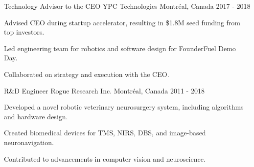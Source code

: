 \begin{cventries}
    \cventry
    {Technology Advisor to the CEO}
    {YPC Technologies}
    {Montréal, Canada}
    {2017 - 2018}
    {
        \begin{cvitems}
            \item{Advised CEO during startup accelerator, resulting in \$1.8M seed funding from top investors.}
            \item{Led engineering team for robotics and software design for FounderFuel Demo Day.}
            \item{Collaborated on strategy and execution with the CEO.}
        \end{cvitems}
    }

    \cventry
    {R\&D Engineer}
    {Rogue Research Inc.}
    {Montréal, Canada}
    {2011 - 2018}
    {
        \begin{cvitems}
            \item{Developed a novel robotic veterinary neurosurgery system, including algorithms and hardware design.}
            \item{Created biomedical devices for TMS, NIRS, DBS, and image-based neuronavigation.}
            \item{Contributed to advancements in computer vision and neuroscience.}
        \end{cvitems}
    }

\end{cventries}
